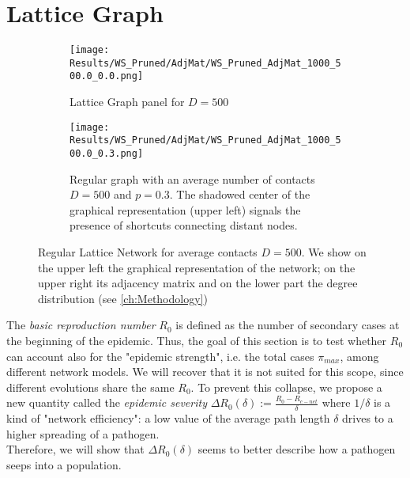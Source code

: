 \documentclass[a4paper,10pt,twoside]{book} %
\theoremstyle{definition}
\begin{document}
\section{Lattice Graph}
\label{sec:res_RegLat}
\begin{figure}[ht]
	\begin{subfigure}[t]{0.48\linewidth}
		\centering
		\texttt{[image: Results/WS\_Pruned/AdjMat/WS\_Pruned\_AdjMat\_1000\_500.0\_0.0.png]}
		\caption{Lattice Graph panel for $D = 500$} 
		\label{fig:net_RegLat_D500}
	\end{subfigure} 
	\hfill
	\begin{subfigure}[t]{0.48\linewidth}
		\centering
		\texttt{[image: Results/WS\_Pruned/AdjMat/WS\_Pruned\_AdjMat\_1000\_500.0\_0.3.png]}
		\caption{Regular graph with an average number of contacts $D = 500$ and $p = 0.3$.
		The shadowed center of the graphical representation (upper left) signals the presence of shortcuts connecting distant nodes.}
		\label{fig:net_RegLat_D500_p0.3}
	\end{subfigure}
	\caption{Regular Lattice Network for average contacts $ D = 500$. We show on the upper left the graphical representation of the network; on the upper right its adjacency matrix and on the lower part the degree distribution (see \autoref{ch:Methodology})}
	\label{fig:net_RegLat}
\end{figure}
The \textit{basic reproduction number} $R_0$ is defined as the number of secondary cases at the beginning of the epidemic. Thus, the goal of this section is to test whether $R_0$ can account also for the "epidemic strength", i.e. the total cases $ \pi_{max}$, among different network models. We will recover that it is not suited for this scope, since different evolutions share the same $ R_0$. 
To prevent this collapse, we propose a new quantity called the \textit{epidemic severity}  $\Delta R_0(\delta):= \frac{R_0 - R_{c-net}}{\delta}$ where $1/\delta$ is a kind of "network efficiency": a low value of the average path length $ \delta$  drives to a higher spreading of a pathogen. 
\\Therefore, we will show that $\Delta R_0(\delta)$ seems to better describe how a pathogen seeps into a population.
\end{document}
